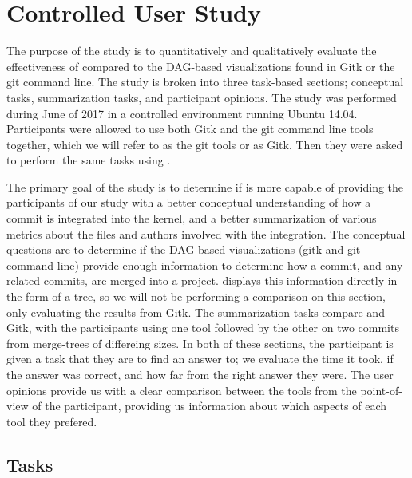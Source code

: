 \section{Controlled User Study}
\label{sec:study}

The purpose of the study is to quantitatively and qualitatively evaluate
the effectiveness of \tool compared to the DAG-based visualizations
found in Gitk or the git command line. The study is broken into three
task-based sections; conceptual tasks, summarization tasks, and
participant opinions. The study was performed during June of 2017
in a controlled environment running Ubuntu 14.04.
Participants were allowed to use both Gitk and the git command line
tools together, which we will refer to as the git tools or as Gitk. Then
they were asked to perform the same tasks using \tool.



The primary goal of the study is to determine if \tool is more capable
of providing the participants of our study with a better conceptual
understanding of how a commit is integrated into the kernel, and a
better summarization of various metrics about the files and authors
involved with the integration. The conceptual questions are to determine
if the DAG-based visualizations (gitk and git command line) provide enough information to determine how a
commit, and any related commits, are merged into a project. \tool
displays this information directly in the form of a tree, so we will not
be performing a comparison on this section, only evaluating the results
from Gitk. The summarization tasks compare \tool and Gitk, with the
participants using one tool followed by the other on two commits from
merge-trees of differeing sizes. In both of these sections, the
participant is given a task that they are to find an answer to; we
evaluate the time it took, if the answer was correct, and how far from
the right answer they were. The user opinions provide us with a clear
comparison between the tools from the point-of-view of the participant,
providing us information about which aspects of each tool they prefered.

\subsection{Tasks}
\label{sub:tasks}

